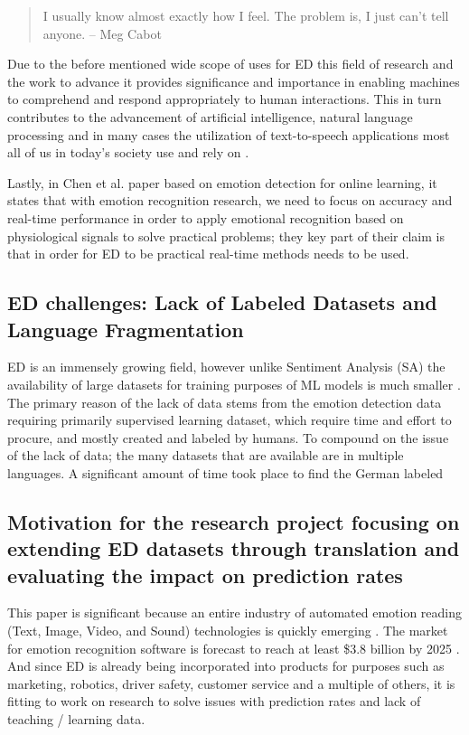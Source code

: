 \documentclass[11pt]{article}
\begin{document}
\begin{quote}
    I usually know almost exactly how I feel. The problem is, I just can’t tell anyone.
    \flushright -- Meg Cabot
\end{quote}

Due to the before mentioned wide scope of uses for ED this field of research and the work to advance it provides significance and importance in enabling machines to comprehend and respond appropriately to human interactions. This in turn contributes to the advancement of artificial intelligence, natural language processing and in many cases the utilization of text-to-speech applications most all of us in today's society use and rely on \cite{ai-framework-detection-emotions}.

Lastly, in Chen et al.\cite{research-emotion-recognition-for-online-learning} paper based on emotion detection for online learning, it states that with emotion recognition research, we need to focus on accuracy and real-time performance in order to apply emotional recognition based on physiological signals to solve practical problems; they key part of their claim is that in order for ED to be practical real-time methods needs to be used.

\subsection{ED challenges: Lack of Labeled Datasets and Language Fragmentation}
ED is an immensely growing field, however unlike Sentiment Analysis (SA) the availability of large datasets for training purposes of ML models is much smaller \cite{ACLU-ED-Data, ai-framework-detection-emotions}. The primary reason of the lack of data stems from the emotion detection data requiring primarily supervised learning dataset, which require time and effort to procure, and mostly created and labeled by humans. To compound on the issue of the lack of data; the many datasets that are available are in multiple languages. A significant amount of time took place to find the German labeled 

\subsection{Motivation for the research project focusing on extending ED datasets through translation and evaluating the impact on prediction rates}

This paper is significant because an entire industry of automated emotion reading (Text, Image, Video, and Sound) technologies is quickly emerging \cite{ACLU-ED-Data, ACLU-THE-DAWN-OF-ROBOT-SURVEILLANCE}. The market for emotion recognition software is forecast to reach at least \$3.8 billion by 2025 \cite{ACLU-ED-Data, ACLU-THE-DAWN-OF-ROBOT-SURVEILLANCE}. And since ED is already being incorporated into products for purposes such as marketing, robotics, driver safety, customer service and a multiple of others, it is fitting to work on research to solve issues with prediction rates and lack of teaching / learning data.
\end{document}
